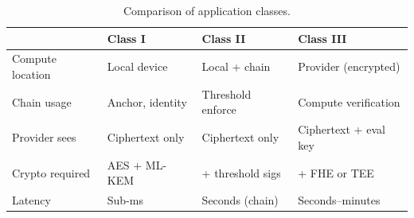 \begin{table}[H]
\centering
\caption{Comparison of application classes.}
\label{tab:classes}
\begin{tabular}{@{}llll@{}}
\toprule
& \textbf{Class I} & \textbf{Class II} & \textbf{Class III} \\
\midrule
Compute location & Local device & Local + chain & Provider (encrypted) \\
Chain usage & Anchor, identity & Threshold enforce & Compute verification \\
Provider sees & Ciphertext only & Ciphertext only & Ciphertext + eval key \\
Crypto required & AES + ML-KEM & + threshold sigs & + FHE or TEE \\
Latency & Sub-ms & Seconds (chain) & Seconds--minutes \\
\bottomrule
\end{tabular}
\end{table}

